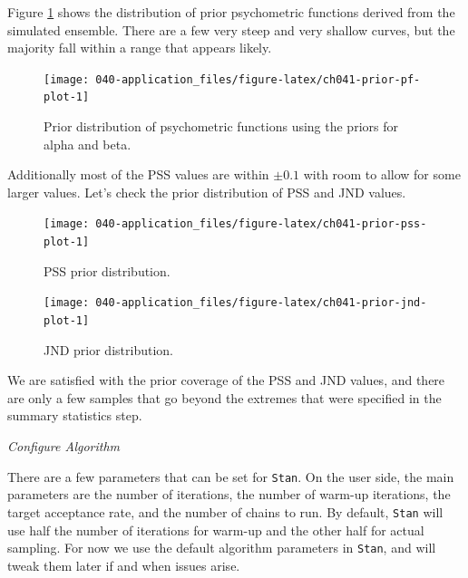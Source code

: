 \documentclass[11pt, oneside, openany]{scrbook}
\begin{document}
Figure \ref{fig:ch041-prior-pf-plot} shows the distribution of prior psychometric functions derived from the simulated ensemble. There are a few very steep and very shallow curves, but the majority fall within a range that appears likely.

\begin{figure}

{\centering \texttt{[image: 040-application\_files/figure-latex/ch041-prior-pf-plot-1]} 

}

\caption{Prior distribution of psychometric functions using the priors for alpha and beta.}\label{fig:ch041-prior-pf-plot}
\end{figure}

Additionally most of the PSS values are within \(\pm 0.1\) with room to allow for some larger values. Let's check the prior distribution of PSS and JND values.

\begin{figure}

{\centering \texttt{[image: 040-application\_files/figure-latex/ch041-prior-pss-plot-1]} 

}

\caption{PSS prior distribution.}\label{fig:ch041-prior-pss-plot}
\end{figure}

\begin{figure}

{\centering \texttt{[image: 040-application\_files/figure-latex/ch041-prior-jnd-plot-1]} 

}

\caption{JND prior distribution.}\label{fig:ch041-prior-jnd-plot}
\end{figure}

We are satisfied with the prior coverage of the PSS and JND values, and there are only a few samples that go beyond the extremes that were specified in the summary statistics step.

\emph{Configure Algorithm}

There are a few parameters that can be set for \texttt{Stan}. On the user side, the main parameters are the number of iterations, the number of warm-up iterations, the target acceptance rate, and the number of chains to run. By default, \texttt{Stan} will use half the number of iterations for warm-up and the other half for actual sampling. For now we use the default algorithm parameters in \texttt{Stan}, and will tweak them later if and when issues arise.
\end{document}
